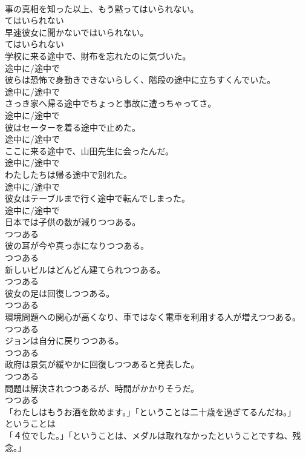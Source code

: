 \documentclass[8pt]{extreport}
\begin{document}
\begin{CJK}{UTF8}{min}
\\	事の真相を知った以上、もう黙ってはいられない。	
\\	てはいられない	
\\	早速彼女に聞かないではいられない。	
\\	てはいられない	
\\	学校に来る途中で、財布を忘れたのに気づいた。	
\\	途中に/途中で	
\\	彼らは恐怖で身動きできないらしく、階段の途中に立ちすくんでいた。	
\\	途中に/途中で	
\\	さっき家へ帰る途中でちょっと事故に遭っちゃってさ。	
\\	途中に/途中で	
\\	彼はセーターを着る途中で止めた。	
\\	途中に/途中で	
\\	ここに来る途中で、山田先生に会ったんだ。	
\\	途中に/途中で	
\\	わたしたちは帰る途中で別れた。	
\\	途中に/途中で	
\\	彼女はテーブルまで行く途中で転んでしまった。	
\\	途中に/途中で	
\\	日本では子供の数が減りつつある。	
\\	つつある	
\\	彼の耳が今や真っ赤になりつつある。	
\\	つつある	
\\	新しいビルはどんどん建てられつつある。	
\\	つつある	
\\	彼女の足は回復しつつある。	
\\	つつある	
\\	環境問題への関心が高くなり、車ではなく電車を利用する人が増えつつある。	
\\	つつある	
\\	ジョンは自分に戻りつつある。	
\\	つつある	
\\	政府は景気が緩やかに回復しつつあると発表した。	
\\	つつある	
\\	問題は解決されつつあるが、時間がかかりそうだ。	
\\	つつある	
\\	「わたしはもうお酒を飲めます。」「ということは二十歳を過ぎてるんだね。」	
\\	ということは	
\\	「４位でした。」「ということは、メダルは取れなかったということですね、残念。」	

\end{CJK}
\end{document}
